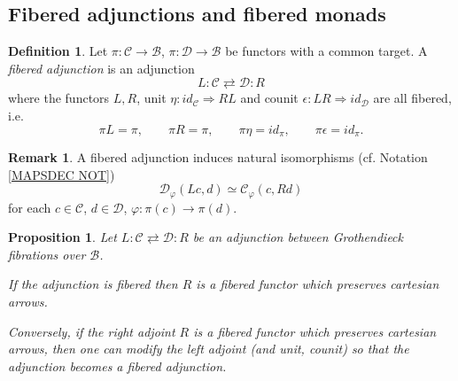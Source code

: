 \documentclass[a4paper,10pt
,draft
]{article}%
\numberwithin{equation}{section}
\numberwithin{figure}{section}
\newtheorem{proposition}[equation]{Proposition}%
\theoremstyle{definition} %
\newtheorem{definition}[equation]{Definition}%
\newtheorem{remark}[equation]{Remark}%
\newcommand{\1}{\ensuremath{\mathbbm 1}}%
\begin{document}
\subsection{Fibered adjunctions and fibered monads}
\label{FIBCAT_SEC}



\begin{definition}\label{FIBADJ DEF}
Let 
$\pi \colon \mathcal{C} \to \mathcal{B}$,
$\pi \colon \mathcal{D} \to \mathcal{B}$
be functors with a common target.
A \emph{fibered adjunction} is an adjunction
\[
L \colon \mathcal{C} \rightleftarrows \mathcal{D} \colon R
\]
where the functors $L,R$, 
unit $\eta \colon id_{\mathcal{C}} \Rightarrow RL$ and 
counit $\epsilon \colon LR \Rightarrow id_{\mathcal{D}}$
are all fibered, i.e.
\[
\pi L=\pi, \qquad
\pi R = \pi, \qquad
\pi \eta = id_{\pi}, \qquad 
\pi\epsilon = id_{\pi}.
\]
\end{definition}



\begin{remark}
A fibered adjunction induces natural isomorphisms
(cf. Notation \ref{MAPSDEC NOT})
\[
\mathcal{D}_{\varphi}\left(Lc,d\right)
\simeq
\mathcal{C}_{\varphi}\left(c,Rd\right)
\]
for each $c\in \mathcal{C}$, $d \in \mathcal{D}$, 
$\varphi \colon \pi(c)\to \pi(d)$. 
\end{remark}



\begin{proposition}\label{FIBADJCAR PROP}
Let $L \colon \mathcal{C} \rightleftarrows \mathcal{D} \colon R$
be an adjunction between Grothendieck fibrations
over $\mathcal{B}$.

If the adjunction is fibered then 
$R$ is 
a fibered functor which preserves cartesian arrows.

Conversely, if the right adjoint $R$ is 
a fibered functor which preserves cartesian arrows, 
then one can modify the left adjoint (and unit, counit)
so that the adjunction becomes a fibered adjunction.
\end{proposition}
\end{document}
